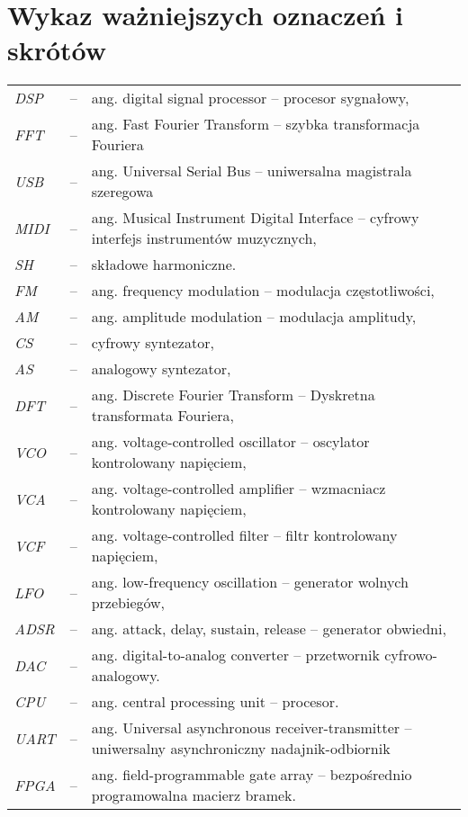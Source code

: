 \chapter*{Wykaz ważniejszych oznaczeń i skrótów}

\begin{tabular}{lcl}
	\textit{DSP} & -- & ang. digital signal processor -- procesor sygnałowy, \\
	\textit{FFT} & -- & ang. Fast Fourier Transform -- szybka transformacja Fouriera \\
	\textit{USB} & -- & ang. Universal Serial Bus -- uniwersalna magistrala szeregowa \\
	\textit{MIDI} & -- & ang. Musical Instrument Digital Interface -- cyfrowy interfejs instrumentów muzycznych, \\
  \textit{SH} & -- & składowe harmoniczne. \\
	\textit{FM} & -- & ang. frequency modulation -- modulacja częstotliwości, \\
	\textit{AM} & -- & ang. amplitude modulation -- modulacja amplitudy, \\
	\textit{CS} & -- & cyfrowy syntezator, \\
	\textit{AS} & -- & analogowy syntezator, \\
	\textit{DFT} & -- & ang. Discrete Fourier Transform -- Dyskretna transformata Fouriera, \\
	\textit{VCO} & -- & ang. voltage-controlled oscillator -- oscylator kontrolowany napięciem, \\
	\textit{VCA} & -- & ang. voltage-controlled amplifier -- wzmacniacz kontrolowany napięciem, \\
	\textit{VCF} & -- & ang. voltage-controlled filter -- filtr kontrolowany napięciem, \\
	\textit{LFO} & -- & ang. low-frequency oscillation -- generator wolnych przebiegów, \\
	\textit{ADSR} & -- & ang. attack, delay, sustain, release -- generator obwiedni, \\
	\textit{DAC} & -- & ang. digital-to-analog converter -- przetwornik cyfrowo-analogowy. \\
	\textit{CPU} & -- & ang. central processing unit -- procesor. \\
	\textit{UART} & -- & ang. Universal asynchronous receiver-transmitter -- uniwersalny asynchroniczny nadajnik-odbiornik \\
	\textit{FPGA} & -- & ang. field-programmable gate array -- bezpośrednio programowalna macierz bramek. \\

\end{tabular}
